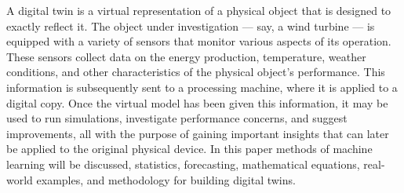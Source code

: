 A digital twin is a virtual representation of a physical object that is designed to exactly reflect it. The
object under investigation — say, a wind turbine — is equipped with a variety of sensors that
monitor various aspects of its operation. These sensors collect data on the energy production,
temperature, weather conditions, and other characteristics of the physical object's performance.
This information is subsequently sent to a processing machine, where it is applied to a digital copy.
Once the virtual model has been given this information, it may be used to run simulations,
investigate performance concerns, and suggest improvements, all with the purpose of gaining
important insights that can later be applied to the original physical device. In this paper methods of
machine learning will be discussed, statistics, forecasting, mathematical equations, real-world
examples, and methodology for building digital twins.

 
